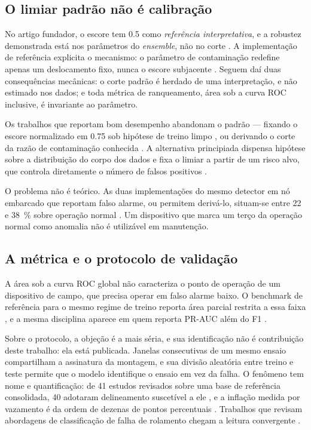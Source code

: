 \subsection{O limiar padrão não é calibração}

No artigo fundador, o escore tem \num{0,5} como \emph{referência interpretativa}, e a
robustez demonstrada está nos parâmetros do \emph{ensemble}, não no corte \cite{liu2008}.
A implementação de referência explicita o mecanismo: o parâmetro de contaminação redefine
apenas um deslocamento fixo, nunca o escore subjacente \cite{scikitlearn2026}. Seguem daí
duas consequências mecânicas: o corte padrão é herdado de uma interpretação, e não estimado
nos dados; e toda métrica de ranqueamento, área sob a curva ROC inclusive, é invariante ao
parâmetro.

Os trabalhos que reportam bom desempenho abandonam o padrão --- fixando o escore
normalizado em \num{0,75} sob hipótese de treino limpo \cite{antonini2023}, ou derivando o
corte da razão de contaminação conhecida \cite{brito2022}. A alternativa principiada
dispensa hipótese sobre a distribuição do corpo dos dados e fixa o limiar a partir de um
risco alvo, que controla diretamente o número de falsos positivos \cite{siffer2017}.

O problema não é teórico. As duas implementações do mesmo detector em nó embarcado que
reportam falso alarme, ou permitem derivá-lo, situam-se entre \num{22} e
\SI{38}{\percent} sobre operação normal \cite{chevtchenko2023,kolok2025}. Um dispositivo que marca um terço da operação
normal como anomalia não é utilizável em manutenção.

\subsection{A métrica e o protocolo de validação}

A área sob a curva ROC global não caracteriza o ponto de operação de um dispositivo de
campo, que precisa operar em falso alarme baixo. O benchmark de referência para o mesmo
regime de treino reporta área parcial restrita a essa faixa \cite{koizumi2020}, e a mesma
disciplina aparece em quem reporta PR-AUC além do F1 \cite{brito2022}.

Sobre o protocolo, a objeção é a mais séria, e sua identificação não é contribuição deste
trabalho: ela está publicada.
Janelas consecutivas de um mesmo ensaio compartilham a assinatura da montagem, e sua
divisão aleatória entre treino e teste permite que o modelo identifique o ensaio em vez da
falha. O fenômeno tem nome e quantificação: de \num{41} estudos revisados sobre uma base de
referência consolidada, \num{40} adotaram delineamento suscetível a ele \cite{varejao2025},
e a inflação medida por vazamento é da ordem de dezenas de pontos percentuais
\cite{vieira2026}. Trabalhos que revisam abordagens de classificação de falha de rolamento
chegam a leitura convergente \cite{abburi2023,smith2015}.

